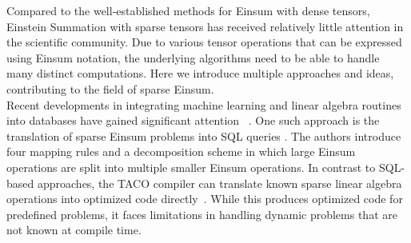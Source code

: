 
\noindent
Compared to the well-established methods for Einsum with dense tensors, Einstein Summation with 
sparse tensors has received relatively little attention in the scientific community. 
Due to various tensor operations that can be expressed using Einsum notation, the 
underlying algorithms need to be able to handle many distinct computations. Here we 
introduce multiple approaches and ideas, contributing to the field of sparse Einsum.\\
Recent developments in integrating machine learning and linear algebra routines into 
databases have gained significant attention
~\cite{Machine_Learning_LinA_and_More, du2020inmachinelearningdatabasereimaginingdeep,
    deepdive, data_management_in_machine_learning}.
One such approach is the translation of sparse Einsum problems into SQL queries 
\cite{sql_einsum}. The authors introduce four mapping rules and a decomposition scheme 
in which large Einsum operations are split into multiple smaller Einsum operations.
In contrast to SQL-based approaches, the TACO compiler can translate known sparse linear 
algebra operations into optimized code directly~\cite{taco}. While this produces 
optimized code for predefined problems, it faces limitations in handling dynamic problems
that are not known at compile time.